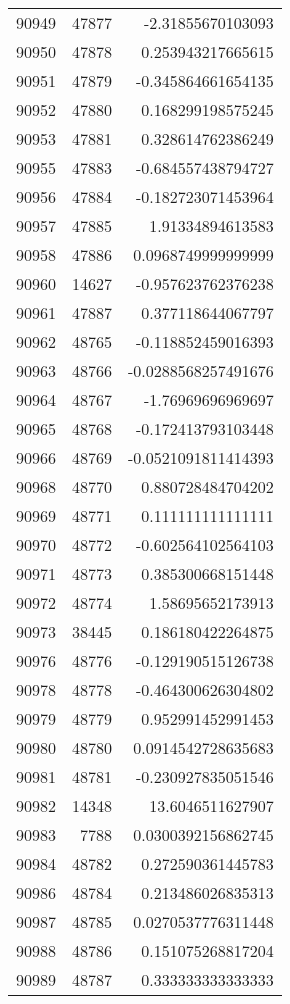 \begin{tabular}{r | r | r}
90949 & 47877 & -2.31855670103093 \\
90950 & 47878 & 0.253943217665615 \\
90951 & 47879 & -0.345864661654135 \\
90952 & 47880 & 0.168299198575245 \\
90953 & 47881 & 0.328614762386249 \\
90955 & 47883 & -0.684557438794727 \\
90956 & 47884 & -0.182723071453964 \\
90957 & 47885 & 1.91334894613583 \\
90958 & 47886 & 0.0968749999999999 \\
90960 & 14627 & -0.957623762376238 \\
90961 & 47887 & 0.377118644067797 \\
90962 & 48765 & -0.118852459016393 \\
90963 & 48766 & -0.0288568257491676 \\
90964 & 48767 & -1.76969696969697 \\
90965 & 48768 & -0.172413793103448 \\
90966 & 48769 & -0.0521091811414393 \\
90968 & 48770 & 0.880728484704202 \\
90969 & 48771 & 0.111111111111111 \\
90970 & 48772 & -0.602564102564103 \\
90971 & 48773 & 0.385300668151448 \\
90972 & 48774 & 1.58695652173913 \\
90973 & 38445 & 0.186180422264875 \\
90976 & 48776 & -0.129190515126738 \\
90978 & 48778 & -0.464300626304802 \\
90979 & 48779 & 0.952991452991453 \\
90980 & 48780 & 0.0914542728635683 \\
90981 & 48781 & -0.230927835051546 \\
90982 & 14348 & 13.6046511627907 \\
90983 & 7788 & 0.0300392156862745 \\
90984 & 48782 & 0.272590361445783 \\
90986 & 48784 & 0.213486026835313 \\
90987 & 48785 & 0.0270537776311448 \\
90988 & 48786 & 0.151075268817204 \\
90989 & 48787 & 0.333333333333333 \\

\end{tabular}
